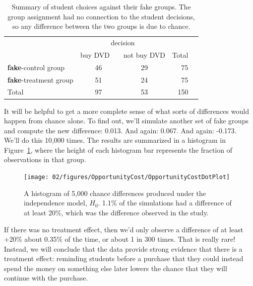 \begin{table}[ht]
\centering
\begin{tabular}{l cc rr}
& \multicolumn{2}{c}{decision} \\
\cline{2-3}
				& {buy DVD}\ \  	& {not buy DVD} & Total & \hspace{3mm}  \\ 
\cline{1-4}
\textbf{fake}-control group 		& 46		& 29	& 75 \\ 
\textbf{fake}-treatment group 	& 51		& 24	& 75 \\ 
\cline{1-4}
Total				& 97		& 53	& 150
\end{tabular}
\caption{Summary of student choices against their fake groups. The group assignment had no connection to the student decisions, so any difference between the two groups is due to chance.}
\label{OpportunityCostTableFake}
\end{table}

It will be helpful to get a more complete sense of what sorts of differences would happen from chance alone. To find out, we'll simulate another set of fake groups and compute the new difference: 0.013. And again: 0.067. And again: -0.173. We'll do this 10,000 times. The results are summarized in a histogram in Figure~\ref{OpportunityCostDotPlot}, where the height of each histogram bar represents the fraction of observations in that group.

\begin{figure}[ht]
\centering
\texttt{[image: 02/figures/OpportunityCost/OpportunityCostDotPlot]}
\caption{A histogram of 5,000 chance differences produced under the independence model, $H_0$. 1.1\% of the simulations had a difference of at least 20\%, which was the difference observed in the study.}
\label{OpportunityCostDotPlot}
\end{figure}

If there was no treatment effect, then we'd only observe a difference of at least +20\% about 0.35\% of the time, or about 1 in 300 times. That is really rare! Instead, we will conclude that the data provide strong evidence that there is a treatment effect: reminding students before a purchase that they could instead spend the money on something else later lowers the chance that they will continue with the purchase.




